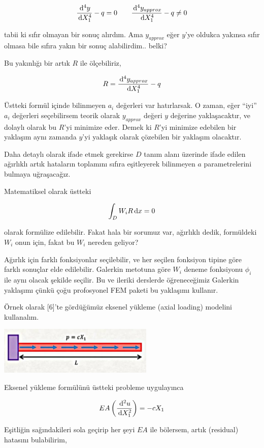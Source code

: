 \documentclass[12pt,fleqn]{article}\usepackage{../../common}
\begin{document}
$$
\frac{\,\mathrm{d}^4 y}{\,\mathrm{d} X_1^4} - q = 0 \qquad
\frac{\,\mathrm{d}^4 y_{approx}}{\,\mathrm{d} X_1^4} - q \ne 0
$$

tabii ki sıfır olmayan bir sonuç alırdım. Ama $y_{approx}$ eğer $y$'ye oldukca
yakınsa sıfır olmasa bile sıfıra yakın bir sonuç alabilirdim.. belki?

Bu yakınlığı bir artık $R$ ile ölçebiliriz,

$$
R = \frac{\,\mathrm{d}^4 y_{approx}}{\,\mathrm{d} X_1^4} - q 
$$

Üstteki formül içinde bilinmeyen $a_i$ değerleri var hatırlarsak. O zaman, eğer
``iyi'' $a_i$ değerleri seçebilirsem teorik olarak $y_{approx}$ değeri $y$
değerine yaklaşacaktır, ve dolaylı olarak bu $R$'yi minimize eder. Demek ki
$R$'yi minimize edebilen bir yaklaşım aynı zamanda $y$'yi yaklaşık olarak
çözebilen bir yaklaşım olacaktır. 

Daha detaylı olarak ifade etmek gerekirse $D$ tanım alanı üzerinde ifade edilen
ağırlıklı artık hataların toplamını sıfıra eşitleyerek bilinmeyen $a$
parametrelerini bulmaya uğraşacağız.

Matematiksel olarak üstteki

$$
\int_D W_i R \,\mathrm{d} x = 0
$$

olarak formülize edilebilir. Fakat hala bir sorumuz var, ağırlıklı dedik,
formüldeki $W_i$ onun için, fakat bu $W_i$ nereden geliyor?

Ağırlık için farklı fonksiyonlar seçilebilir, ve her seçilen fonksiyon tipine
göre farklı sonuçlar elde edilebilir. Galerkin metotuna göre $W_i$ deneme
fonksiyonu $\phi_i$ ile aynı olacak şekilde seçilir. Bu ve ileriki derslerde
öğreneceğimiz Galerkin yaklaşımı çünkü çoğu profosyonel FEM paketi bu yaklaşımı
kullanır.

Örnek olarak [6]'te gördüğümüz eksenel yükleme (axial loading) modelini
kullanalım. 

\includegraphics[width=20em]{compscieng_bpp45fem1_01.jpg}

Eksenel yükleme formülünü üstteki probleme uygulayınca

$$
EA \left( \frac{\,\mathrm{d}^2 u}{\,\mathrm{d} X_1^2}  \right) = -c X_1
$$

Eşitliğin sağındakileri sola geçirip her şeyi $EA$ ile bölersem, artık
(residual) hatasını bulabilirim,
\end{document}
